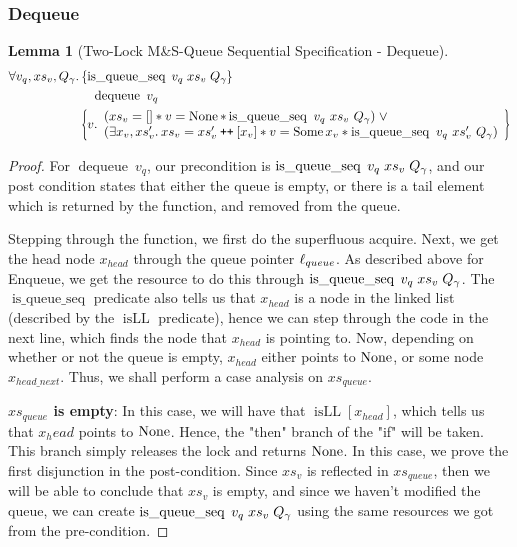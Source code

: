 \documentclass[a4paper, 11pt]{report}
\newtheorem{lemma}[theorem]{Lemma}
\newcommand{\dequeue}{\operatorname{dequeue}}
\newcommand{\isqueueseq}{\operatorname{is\_queue\_seq}}
\newcommand{\isLL}{\operatorname{isLL}}
\newcommand\catenate{\mathbin{\text{\ttfamily\upshape ++}}}
\newcommand{\tlseqspecdeq}{\All v_q, xs_v, Q_\gname. \hoareV[t]{\isqueueseq \; v_q \; xs_v \; Q_\gname}{\dequeue\ v_q}{v . \begin{array}{l}(xs_v = [] \star v = \None \star \isqueueseq\ v_q\ xs_v\ Q_\gname) \; \lor\\ (\Exists x_v, xs_v' . xs_v = xs_v' \catenate [x_v] \star v = \Some x_v \star \isqueueseq\ v_q\ xs_v'\ Q_\gname) \end{array}}}
\begin{document}
\subsubsection{Dequeue}
\begin{lemma}[Two-Lock M\&S-Queue Sequential Specification - Dequeue]\label{TLMSQ:spec:seq:dequeue}
  \begin{equation*}
    \tlseqspecdeq
  \end{equation*}
\end{lemma}
\begin{proof}
For $\dequeue\ v_q$, our precondition is $\isqueueseq \; v_q \; xs_v \; Q_\gname$, and our post condition states that either the queue is empty, or there is a tail element which is returned by the function, and removed from the queue.

Stepping through the function, we first do the superfluous acquire. Next, we get the head node $x_{head}$ through the queue pointer $\ell_{queue}$. As described above for Enqueue, we get the resource to do this through $\isqueueseq \; v_q \; xs_v \; Q_\gname$. The $\isqueueseq$ predicate also tells us that $x_{head}$ is a node in the linked list (described by the $\isLL$ predicate), hence we can step through the code in the next line, which finds the node that $x_{head}$ is pointing to. Now, depending on whether or not the queue is empty, $x_{head}$ either points to $\operatorname{None}$, or some node $x_{head\_next}$. Thus, we shall perform a case analysis on $xs_{queue}$.

\textbf{$xs_{queue}$ is empty}: In this case, we will have that $\isLL [x_{head}]$, which tells us that $x_head$ points to $\operatorname{None}$. Hence, the "then" branch of the "if" will be taken. This branch simply releases the lock and returns $\operatorname{None}$. In this case, we prove the first disjunction in the post-condition. Since $xs_v$ is reflected in $xs_{queue}$, then we will be able to conclude that $xs_v$ is empty, and since we haven't modified the queue, we can create $\isqueueseq \; v_q \; xs_v \; Q_\gname$ using the same resources we got from the pre-condition.


\end{proof}
\end{document}
